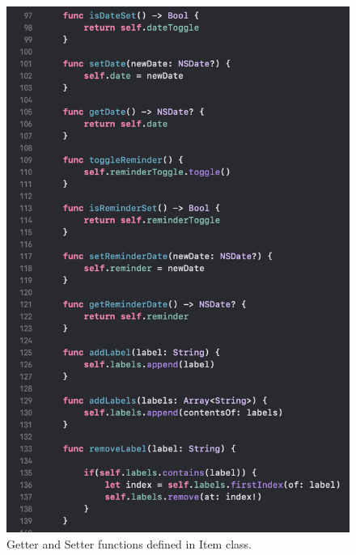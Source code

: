 \begin{figure}[H]
    \centering
    \includegraphics[width=\textwidth]{./graphics/Implementation/Dashboard/item3.png}
    \caption{Getter and Setter functions defined in Item class.}
    \label{fig:item3}
\end{figure}

